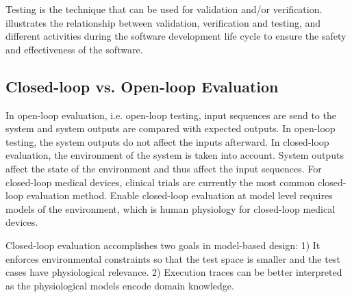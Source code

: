 Testing is the technique that can be used for validation and/or verification.  illustrates the relationship between validation, verification and testing, and different activities during the software development life cycle to ensure the safety and effectiveness of the software.
\subsection{Closed-loop vs. Open-loop Evaluation}
In open-loop evaluation, i.e. open-loop testing, input sequences are send to the system and system outputs are compared with expected outputs. In open-loop testing, the system outputs do not affect the inputs afterward. In closed-loop evaluation, the environment of the system is taken into account. System outputs affect the state of the environment and thus affect the input sequences. For closed-loop medical devices, clinical trials are currently the most common closed-loop evaluation method. Enable closed-loop evaluation at model level requires models of the environment, which is human physiology for closed-loop medical devices.

Closed-loop evaluation accomplishes two goals in model-based design: 1) It enforces environmental constraints so that the test space is smaller and the test cases have physiological relevance. 2) Execution traces can be better interpreted as the physiological models encode domain knowledge. 

